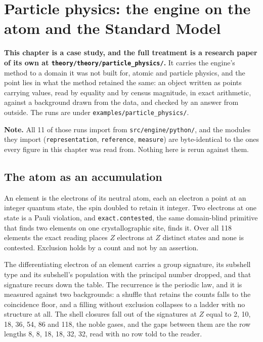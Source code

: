\chapter{Particle physics: the engine on the atom and the Standard Model}

\textbf{This chapter is a case study, and the full treatment is a research paper of its own at
\texttt{theory/\allowbreak{}theory/\allowbreak{}particle\_physics/}.} It carries the engine's method to a domain it was not
built for, atomic and particle physics, and the point lies in what the method retained the same: an object
written as points carrying values, read by equality and by census magnitude, in exact arithmetic,
against a background drawn from the data, and checked by an answer from outside. The runs are under
\texttt{examples/\allowbreak{}particle\_physics/}.

\textbf{Note.} All 11 of those runs import from \texttt{src/\allowbreak{}engine/\allowbreak{}python/}, and the modules they
import (\texttt{representation}, \texttt{reference}, \texttt{measure}) are byte-identical to the ones
every figure in this chapter was read from. Nothing here is rerun against them.

\section{The atom as an accumulation}

An element is the electrons of its neutral atom, each an electron a point at an integer quantum state,
the spin doubled to retain it integer. Two electrons at one state is a Pauli violation, and
\texttt{exact.contested}, the same domain-blind primitive that finds two elements on one
crystallographic site, finds it. Over all 118 elements the exact reading places $Z$ electrons at $Z$
distinct states and none is contested. Exclusion holds by a count and not by an assertion.

The differentiating electron of an element carries a group signature, its subshell type and its
subshell's population with the principal number dropped, and that signature recurs down the table. The
recurrence is the periodic law, and it is measured against two backgrounds: a shuffle that retains the
counts falls to the coincidence floor, and a filling without exclusion collapses to a ladder with no
structure at all. The shell closures fall out of the signatures at $Z$ equal to 2, 10, 18, 36, 54, 86
and 118, the noble gases, and the gaps between them are the row lengths 8, 8, 18, 18, 32, 32, read with
no row told to the reader.

